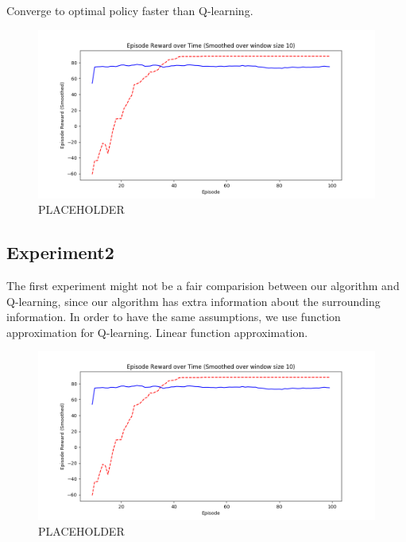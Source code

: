 Converge to optimal policy faster than Q-learning.

\begin{figure}[!htb]
\centering
\includegraphics[width=1.0\textwidth]{./figures/placeholder}
\caption{PLACEHOLDER}
\label{proposed_architecture}
\end{figure}
    


\subsection{Experiment2}

The first experiment might not be a fair comparision between our algorithm and Q-learning, since our algorithm has extra information about the surrounding information.
In order to have the same assumptions, we use function approximation for Q-learning. 
Linear function approximation. 

\begin{figure}[!htb]
\centering
\includegraphics[width=1.0\textwidth]{./figures/placeholder}
\caption{PLACEHOLDER}
\label{proposed_architecture}
\end{figure}
    

